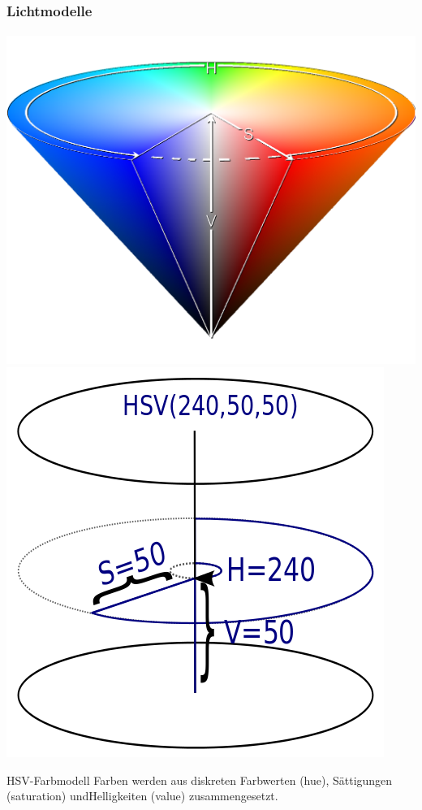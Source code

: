 \documentclass{beamer}
\begin{document}
\begin{frame}
    \frametitle{Lichtmodelle}
\framesubtitle{}
\includegraphics[scale=0.1]{images/hsv}
\includegraphics[scale=0.2]{images/hsvc}
\begin{block}{HSV-Farbmodell}
Farben werden aus diskreten Farbwerten (hue), Sättigungen (saturation) undHelligkeiten (value) zusammengesetzt. 
\end{block}
\end{frame}
\end{document}
